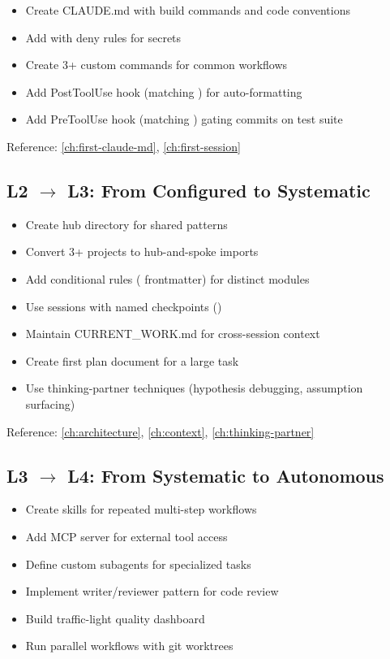 \begin{itemize}
  \item[$\square$] Create CLAUDE.md with build commands and code conventions
  \item[$\square$] Add  with deny rules for secrets
  \item[$\square$] Create 3+ custom commands for common workflows
  \item[$\square$] Add PostToolUse hook (matching ) for auto-formatting
  \item[$\square$] Add PreToolUse hook (matching ) gating commits on test suite
\end{itemize}

Reference: \cref{ch:first-claude-md}, \cref{ch:first-session}

\subsection{\texorpdfstring{L2 $\rightarrow$ L3}{L2 to L3}: From Configured to Systematic}

\begin{itemize}
  \item[$\square$] Create hub directory for shared patterns
  \item[$\square$] Convert 3+ projects to hub-and-spoke imports
  \item[$\square$] Add conditional rules ( frontmatter) for distinct modules
  \item[$\square$] Use sessions with named checkpoints ()
  \item[$\square$] Maintain CURRENT\_WORK.md for cross-session context
  \item[$\square$] Create first plan document for a large task
  \item[$\square$] Use thinking-partner techniques (hypothesis debugging, assumption surfacing)
\end{itemize}

Reference: \cref{ch:architecture}, \cref{ch:context}, \cref{ch:thinking-partner}

\subsection{\texorpdfstring{L3 $\rightarrow$ L4}{L3 to L4}: From Systematic to Autonomous}

\begin{itemize}
  \item[$\square$] Create skills for repeated multi-step workflows
  \item[$\square$] Add MCP server for external tool access
  \item[$\square$] Define custom subagents for specialized tasks
  \item[$\square$] Implement writer/reviewer pattern for code review
  \item[$\square$] Build traffic-light quality dashboard
  \item[$\square$] Run parallel workflows with git worktrees
\end{itemize}

